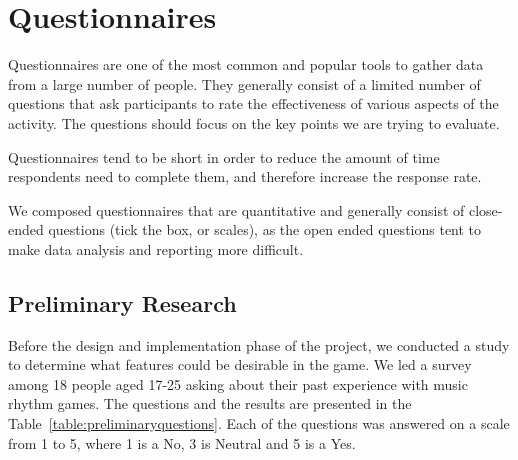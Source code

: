 \vspace{20pt}
\newpage

\section{Questionnaires}

Questionnaires are one of the most common and popular tools to gather data from a large number of people. They generally consist of a limited number of questions that ask participants to rate the effectiveness of various aspects of the activity. The questions should focus on the key points we are trying to evaluate. 

Questionnaires tend to be short in order to reduce the amount of time respondents need to complete them, and therefore increase the response rate. 

We composed questionnaires that are quantitative and generally consist of close-ended questions (tick the box, or scales), as the open ended questions tent to make data analysis and reporting more difficult.

\vspace{10pt}
\subsection*{Preliminary Research}

Before the design and implementation phase of the project, we conducted a study to determine what features could be desirable in the game. We led a survey among 18 people aged 17-25 asking about their past experience with music rhythm games. 
The questions and the results are presented in the Table~\ref{table:preliminaryquestions}. Each of the questions was answered on a scale from 1 to 5, where 1 is a No,  3 is Neutral and 5 is a Yes.

